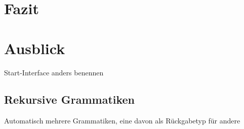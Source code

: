 \documentclass[../InterneDSLs.tex]{subfiles}
\begin{document}
\chapter{Fazit}

\chapter{Ausblick}
Start-Interface anders benennen
\section{Rekursive Grammatiken}
Automatisch mehrere Grammatiken, eine davon als Rückgabetyp für andere
\end{document}
